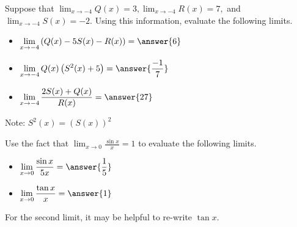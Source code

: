 \documentclass[handout]{ximera}
\begin{document}
\begin{exercise}

Suppose that $\displaystyle\lim_{x \to -4} Q(x) = 3, \displaystyle\lim_{x\to -4} R(x) = 7,$ and $\displaystyle\lim_{x\to -4} S(x) = -2$.  Using this information, evaluate the following limits. 

\begin{itemize}

\item $\displaystyle\lim_{x \to -4} \left( Q(x) -5S(x) - R(x) \right) = \answer{6}$

\item $\displaystyle\lim_{x \to -4} Q(x)\left(S^2(x) + 5 \right) = \answer{\frac{-1}{7}}$

\item $\displaystyle\lim_{x \to -4} \frac{2S(x) + Q(x)}{R(x)} = \answer{27}$

\end{itemize}

\begin{hint}

Note: $S^2(x) = (S(x))^2$

\end{hint}

\end{exercise}

\begin{exercise}

Use the fact that $\displaystyle\lim_{x \to 0} \frac{\sin x}{x} = 1$ to evaluate the following limits. 

\begin{itemize}

\item $\displaystyle\lim_{x \to 0} \frac{ \sin x}{5x} = \answer{\frac{1}{5}}$

\item $\displaystyle\lim_{x \to 0} \frac{\tan x}{x} = \answer{1}$

\end{itemize}

\begin{hint}

For the second limit, it may be helpful to re-write $\tan x$.

\end{hint}

\end{exercise}
\end{document}
